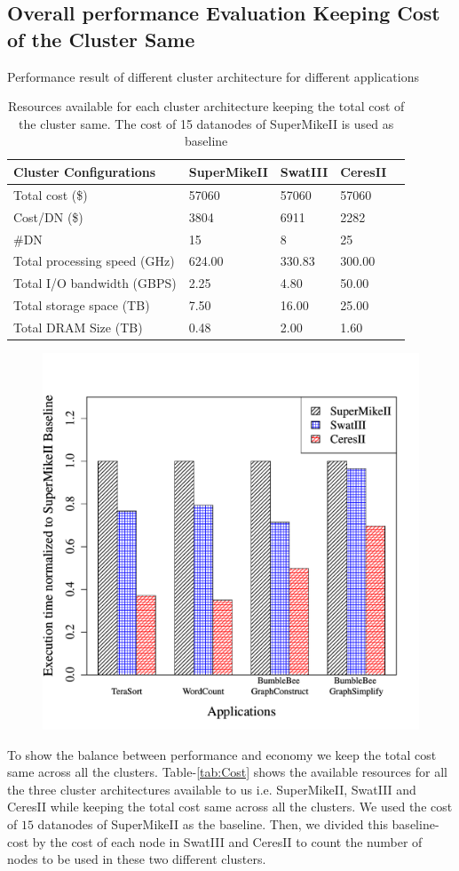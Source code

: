\documentclass[journal]{IEEEtran}
\begin{document}
\subsection{Overall performance Evaluation Keeping Cost of the Cluster Same}
\begin{table}[!t]
\caption{Performance result of different cluster architecture for different applications}
\label{fig:perf}
\centering
\begin{tabular}{|p{2.5cm}|p{1.5cm}|p{1.5cm}|p{1.5cm}|p{1.5cm}|} \hline
Cluster Configurations & SuperMikeII & SwatIII & CeresII\\ \hline
Total cost (\$) & 57060 & 57060 & 57060\\ \hline
Cost/DN (\$) & 3804 & 6911 & 2282\\ \hline
\#DN & 15 & 8 & 25\\ \hline
Total processing speed (GHz) & 624.00 & 330.83 & 300.00\\ \hline
Total I/O bandwidth (GBPS) & 2.25 & 4.80 & 50.00\\ \hline
Total storage space (TB) & 7.50 & 16.00 & 25.00\\ \hline
Total DRAM Size (TB) & 0.48 & 2.00 & 1.60\\ \hline
\end{tabular}
\caption{Resources available for each cluster architecture keeping the total cost of the cluster same. The cost of 15 datanodes of SuperMikeII is used as baseline}
\label{tab:ScalingCost}
\end{table}
\begin{figure}[!t]
\centering
\includegraphics[width=.5\textwidth]{Figures/PerformanceFigures/execTime.pdf}
\end{figure}
To show the balance between performance and economy we keep the total cost same across all the clusters. Table-\ref{tab:Cost} shows the available resources for all the three cluster architectures available to us i.e. SuperMikeII, SwatIII and CeresII while keeping the total cost same across all the clusters. We used the cost of $15$ datanodes of SuperMikeII as the baseline. Then, we divided this baseline-cost by the cost of each node in SwatIII and CeresII to count the number of nodes to be used in these two different clusters.
\end{document}
